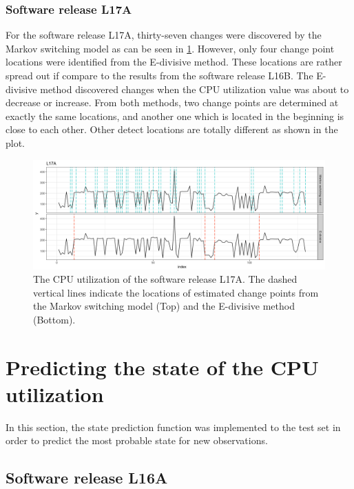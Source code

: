 \subsubsection{Software release L17A}

For the software release L17A, thirty-seven changes were discovered
by the Markov switching model as can be seen in \ref{compare_L17A}.
However, only four change point locations were identified from the
E-divisive method. These locations are rather spread out if compare
to the results from the software release L16B. The E-divisive method
discovered changes when the CPU utilization value was about to decrease
or increase. From both methods, two change points are determined at
exactly the same locations, and another one which is located in the
beginning is close to each other. Other detect locations are totally
different as shown in the plot. 

\begin{figure}[H]
\begin{centering}
\includegraphics[scale=0.35]{picture/compare_L17A}
\par\end{centering}
\caption{The CPU utilization of the software release L17A. The dashed vertical
lines indicate the locations of estimated change points from the Markov
switching model (Top) and the E-divisive method (Bottom). }

\label{compare_L17A}
\end{figure}


\section{Predicting the state of the CPU utilization \label{sec:Predict}}

In this section, the state prediction function was implemented to
the test set in order to predict the most probable state for new observations. 

\subsection{Software release L16A}

